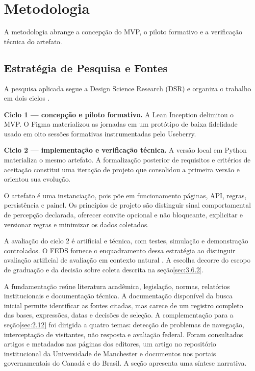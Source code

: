 \chapter{Metodologia}
\label{cap:3}

A metodologia abrange a concepção do MVP, o piloto formativo e a verificação técnica do artefato.

\section{Estratégia de Pesquisa e Fontes}
\label{sec:3.1}

A pesquisa aplicada segue a Design Science Research (DSR) e organiza o trabalho em dois ciclos \cite{hevner2004,peffers2007}.

\textbf{Ciclo 1 --- concepção e piloto formativo.} A Lean Inception delimitou o MVP. O Figma materializou as jornadas em um protótipo de baixa fidelidade usado em oito sessões formativas instrumentadas pelo Useberry.

\textbf{Ciclo 2 --- implementação e verificação técnica.} A versão local em Python materializa o mesmo artefato. A formalização posterior de requisitos e critérios de aceitação constitui uma iteração de projeto que consolidou a primeira versão e orientou sua evolução.

O artefato é uma instanciação, pois põe em funcionamento páginas, API, regras, persistência e painel. Os princípios de projeto são distinguir sinal comportamental de percepção declarada, oferecer convite opcional e não bloqueante, explicitar e versionar regras e minimizar os dados coletados.

A avaliação do ciclo 2 é artificial e técnica, com testes, simulação e demonstração controlados. O FEDS fornece o enquadramento dessa estratégia ao distinguir avaliação artificial de avaliação em contexto natural \cite{venable2016}. A escolha decorre do escopo de graduação e da decisão sobre coleta descrita na seção\nobreakspace{}\ref{sec:3.6.2}.

A fundamentação reúne literatura acadêmica, legislação, normas, relatórios institucionais e documentação técnica. A documentação disponível da busca inicial permite identificar as fontes citadas, mas carece de um registro completo das bases, expressões, datas e decisões de seleção. A complementação para a seção\nobreakspace{}\ref{sec:2.12} foi dirigida a quatro temas: detecção de problemas de navegação, interceptação de visitantes, não resposta e avaliação federal. Foram consultados artigos e metadados nas páginas dos editores, um artigo no repositório institucional da Universidade de Manchester e documentos nos portais governamentais do Canadá e do Brasil. A seção apresenta uma síntese narrativa.


